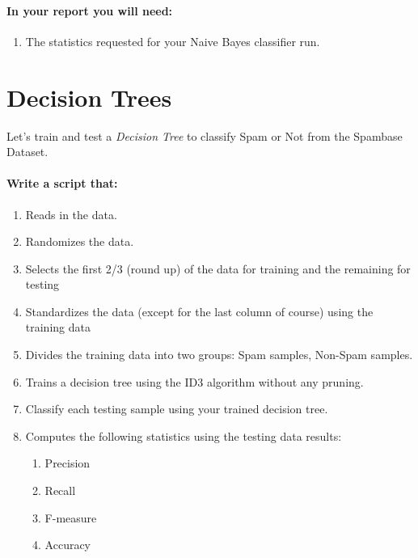 \documentclass[12pt]{article}
\begin{document}
\paragraph{In your report you will need:}
\begin{enumerate}
\item The statistics requested for your Naive Bayes classifier run.
\end{enumerate}

\newpage

\section{Decision Trees}\label{naive}
Let's train and test a \emph{Decision Tree} to classify Spam or Not from the Spambase Dataset.\\


\noindent
\paragraph{Write a script that:}
\begin{enumerate}
  \item Reads in the data.
  \item Randomizes the data.
  \item Selects the first 2/3 (round up) of the data for training and the remaining for testing
  \item Standardizes the data (except for the last column of course) using the training data
  \item Divides the training data into two groups: Spam samples, Non-Spam samples.
  \item Trains a decision tree using the ID3 algorithm without any pruning.
  \item Classify each testing sample using your trained decision tree.
  \item Computes the following statistics using the testing data results:
    \begin{enumerate}
        \item Precision
        \item Recall
        \item F-measure
        \item Accuracy
    \end{enumerate}
\end{enumerate}
\end{document}

